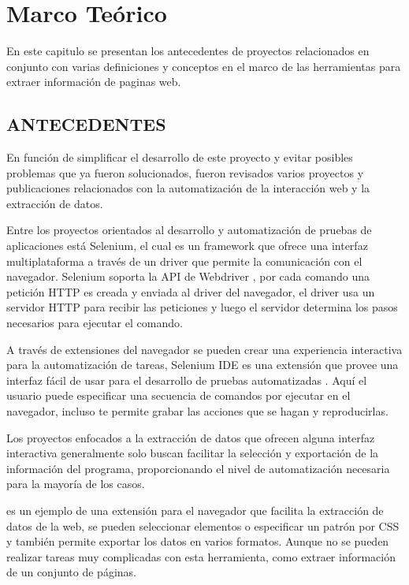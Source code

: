 \documentclass[12pt]{report}
\begin{document}
\break


\chapter{Marco Teórico}

En este capitulo se presentan los antecedentes de proyectos relacionados en conjunto con varias definiciones y conceptos en el marco de las herramientas para extraer información de paginas web.

\section[Antecedentes]{ANTECEDENTES}

En función de simplificar el desarrollo de este proyecto y evitar posibles problemas que ya fueron solucionados, fueron revisados varios proyectos y publicaciones relacionados con la automatización de la interacción web y la extracción de datos.

Entre los proyectos orientados al desarrollo y automatización de pruebas de aplicaciones está Selenium, el cual es un framework que ofrece una interfaz multiplataforma a través de un driver que permite la comunicación con el navegador. Selenium soporta la API de Webdriver \cite{w3c2022webdriver}, por cada comando una petición HTTP es creada y enviada al driver del navegador, el driver usa un servidor HTTP para recibir las peticiones y luego el servidor determina los pasos necesarios para ejecutar el comando.

A través de extensiones del navegador se pueden crear una experiencia interactiva para la automatización de tareas, Selenium IDE es una extensión que provee una interfaz fácil de usar para el desarrollo de pruebas automatizadas \cite{selenium_documentation_2022}. Aquí el usuario puede especificar una secuencia de comandos por ejecutar en el navegador, incluso te permite grabar las acciones que se hagan y reproducirlas.

Los proyectos enfocados a la extracción de datos que ofrecen alguna interfaz interactiva generalmente solo buscan facilitar la selección y exportación de la información del programa, proporcionando el nivel de automatización necesaria para la mayoría de los casos. 

\cite{dataminer2022} es un ejemplo de una extensión para el navegador que facilita la extracción de datos de la web, se pueden seleccionar elementos o especificar un patrón por CSS y también permite exportar los datos en varios formatos. Aunque no se pueden realizar tareas muy complicadas con esta herramienta, como extraer información de un conjunto de páginas. 
\end{document}
